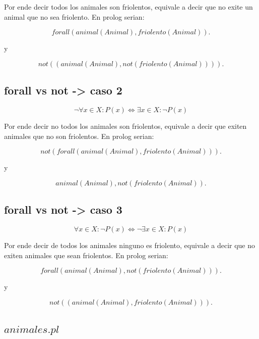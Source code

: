 \documentclass[11pt,a4paper]{article}
\begin{document}
Por ende decir todos los animales son friolentos, equivale a decir que no exite un animal que no sea friolento.
En prolog serian:

\begin{equation*}
	forall(animal(Animal), friolento(Animal)).
\end{equation*}  

y

\begin{equation*}
	not((animal(Animal),not(friolento(Animal)))).
\end{equation*}

\subsection{forall vs not -> caso 2}

\begin{equation}
	\neg \forall x \in X: P(x) \iff \exists x \in X: \neg P(x)
\end{equation}

Por ende decir no todos los animales son friolentos, equivale a decir que exiten animales que no son friolentos.
En prolog serian:

\begin{equation*}
	not (forall(animal(Animal), friolento(Animal))).
\end{equation*}  

y 

\begin{equation*}
	animal(Animal),not(friolento(Animal)).
\end{equation*}

 \subsection{forall vs not -> caso 3}
 
 \begin{equation}
	\forall x \in X: \neg P(x) \iff \neg \exists x \in X: P(x)
\end{equation}
 
Por ende decir de todos los animales ninguno es friolento, equivale a decir que no exiten animales que sean friolentos.
En prolog serian:
 
\begin{equation*}
	forall(animal(Animal), not(friolento(Animal))).
\end{equation*}  

y

\begin{equation*}
	not((animal(Animal),friolento(Animal))).
\end{equation*}

\subsection{$animales.pl$}
 
 
\newpage

\appendix

%
%
%
\end{document}
